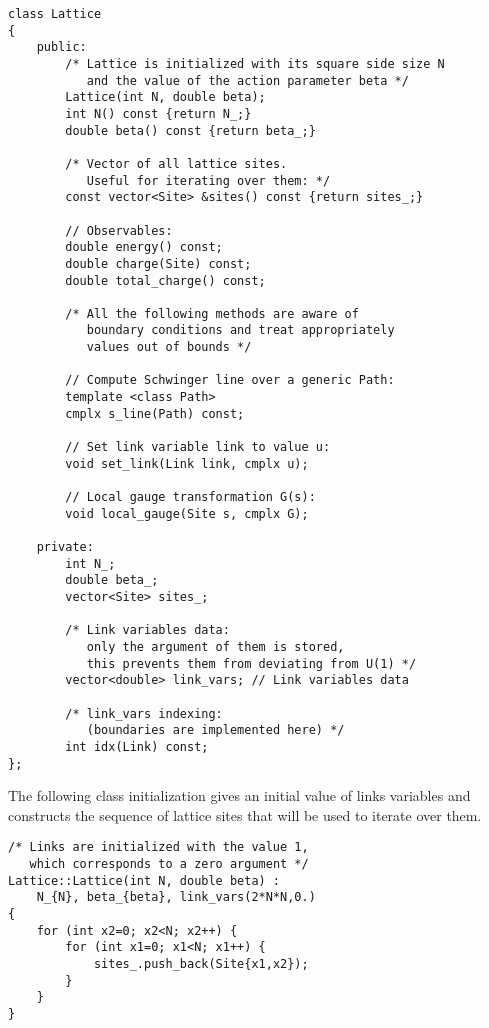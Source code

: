 \begin{lstlisting}[caption={Lattice class}]
class Lattice
{
    public:
        /* Lattice is initialized with its square side size N
           and the value of the action parameter beta */
        Lattice(int N, double beta);
        int N() const {return N_;}
        double beta() const {return beta_;}
        
        /* Vector of all lattice sites.
           Useful for iterating over them: */
        const vector<Site> &sites() const {return sites_;}
        
        // Observables: 
        double energy() const;
        double charge(Site) const;
        double total_charge() const;
        
        /* All the following methods are aware of
           boundary conditions and treat appropriately
           values out of bounds */
        
        // Compute Schwinger line over a generic Path:
        template <class Path>
        cmplx s_line(Path) const;
        
        // Set link variable link to value u:
        void set_link(Link link, cmplx u);
        
        // Local gauge transformation G(s):
        void local_gauge(Site s, cmplx G);
        
    private:
        int N_;
        double beta_;
        vector<Site> sites_;

        /* Link variables data:
           only the argument of them is stored,
           this prevents them from deviating from U(1) */
        vector<double> link_vars; // Link variables data
        
        /* link_vars indexing:
           (boundaries are implemented here) */
        int idx(Link) const;
};
\end{lstlisting}

The following class initialization gives an initial value of links variables and constructs the sequence of lattice sites that will be used to iterate over them.

\begin{lstlisting}[caption={Lattice constructor}]
/* Links are initialized with the value 1,
   which corresponds to a zero argument */
Lattice::Lattice(int N, double beta) :
    N_{N}, beta_{beta}, link_vars(2*N*N,0.)
{
    for (int x2=0; x2<N; x2++) {
        for (int x1=0; x1<N; x1++) {
            sites_.push_back(Site{x1,x2});
        }
    }
}
\end{lstlisting}

